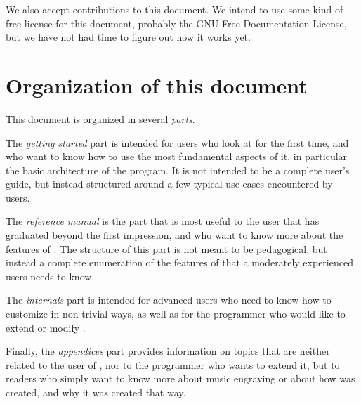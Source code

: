 We also accept contributions to this document.  We intend to use some
kind of free license for this document, probably the GNU Free
Documentation License, but we have not had time to figure out how it
works yet. 
\section{Organization of this document}

This document is organized in several \emph{parts}.  

The \emph{getting started} part is intended for users who look at
{\gs} for the first time, and who want to know how to use the most
fundamental aspects of it, in particular the basic architecture of the
program.  It is not intended to be a complete user's guide, but
instead structured around a few typical use cases encountered by
users. 

The \emph{reference manual} is the part that is most useful to the
user that has graduated beyond the first impression, and who want to
know more about the features of {\gs}.  The structure of this part is
not meant to be pedagogical, but instead a complete enumeration of the
features of {\gs} that a moderately experienced users needs to know. 

The \emph{internals} part is intended for advanced users who need to
know how to customize {\gs} in non-trivial ways, as well as for the
programmer who would like to extend or modify {\gs}.

Finally, the \emph{appendices} part provides information on topics
that are neither related to the user of {\gs}, nor to the programmer
who wants to extend it, but to readers who simply want to know more
about music engraving or about how {\gs} was created, and why it was
created that way. 

